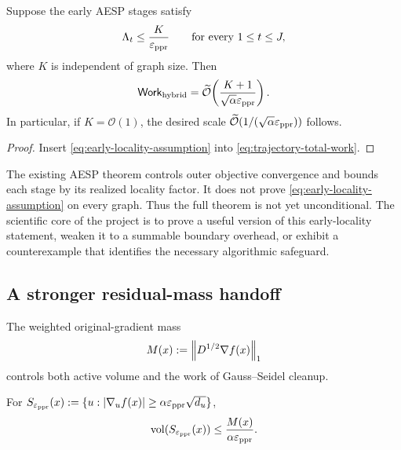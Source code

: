 \begin{theorem}
\label{thm:conditional-total}
Suppose the early AESP stages satisfy
\begin{equation}
    \Lambda_t\leq\frac{K}{\varepsilon_{\mathrm{ppr}}}
    \qquad\text{for every }1\leq t\leq J,
    \label{eq:early-locality-assumption}
\end{equation}
where \(K\) is independent of graph size.  Then
\begin{equation}
    \mathsf{Work}_{\rm hybrid}
    =\widetilde{\mathcal O}\!\left(
       \frac{K+1}{\sqrt\alpha\varepsilon_{\mathrm{ppr}}}
    \right).
    \label{eq:conditional-total-work}
\end{equation}
In particular, if \(K=\mathcal O(1)\), the desired scale
\(\widetilde{\mathcal O}(1/(\sqrt\alpha\varepsilon_{\mathrm{ppr}}))\) follows.
\end{theorem}

\begin{proof}
Insert \cref{eq:early-locality-assumption} into
\cref{eq:trajectory-total-work}.
\end{proof}

\begin{remark}
The existing AESP theorem controls outer objective convergence and bounds each
stage by its realized locality factor.  It does not prove
\cref{eq:early-locality-assumption} on every graph.  Thus the full theorem is
not yet unconditional.  The scientific core of the project is to prove a
useful version of this early-locality statement, weaken it to a summable
boundary overhead, or exhibit a counterexample that identifies the necessary
algorithmic safeguard.
\end{remark}

\subsection{A stronger residual-mass handoff}
\label{sec:mass-handoff}

The weighted original-gradient mass
\begin{equation}
    M(x):=\left\lVert D^{1/2}\nabla f(x)\right\rVert_1
    \label{eq:mass-functional}
\end{equation}
controls both active volume and the work of Gauss--Seidel cleanup.

\begin{lemma}
\label{lem:mass-volume}
For
\(
S_{\varepsilon_{\mathrm{ppr}}}(x):=\{u:\left\lvert \nabla_u f(x)\right\rvert\geq\alpha\varepsilon_{\mathrm{ppr}}\sqrt{d_u}\}
\),
\begin{equation}
    \operatorname{vol}(S_{\varepsilon_{\mathrm{ppr}}}(x))
    \leq\frac{M(x)}{\alpha\varepsilon_{\mathrm{ppr}}}.
    \label{eq:mass-volume-bound}
\end{equation}
\end{lemma}

